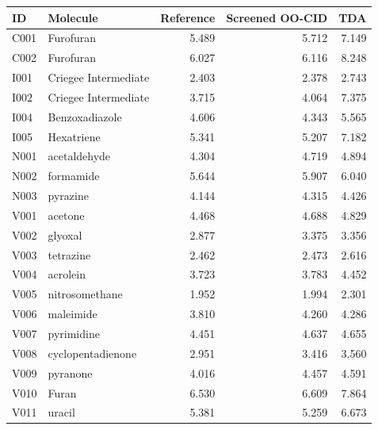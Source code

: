\begin{tabular}{llrrr}\toprule
ID & Molecule & Reference & Screened OO-CID & TDA \\ \midrule
C001 & Furofuran & 5.489 & 5.712 & 7.149 \\
C002 & Furofuran & 6.027 & 6.116 & 8.248 \\
I001 & Criegee Intermediate & 2.403 & 2.378 & 2.743 \\
I002 & Criegee Intermediate & 3.715 & 4.064 & 7.375 \\
I004 & Benzoxadiazole & 4.606 & 4.343 & 5.565 \\
I005 & Hexatriene & 5.341 & 5.207 & 7.182 \\
N001 & acetaldehyde & 4.304 & 4.719 & 4.894 \\
N002 & formamide & 5.644 & 5.907 & 6.040 \\
N003 & pyrazine & 4.144 & 4.315 & 4.426 \\
V001 & acetone & 4.468 & 4.688 & 4.829 \\
V002 & glyoxal & 2.877 & 3.375 & 3.356 \\
V003 & tetrazine & 2.462 & 2.473 & 2.616 \\
V004 & acrolein & 3.723 & 3.783 & 4.452 \\
V005 & nitrosomethane & 1.952 & 1.994 & 2.301 \\
V006 & maleimide & 3.810 & 4.260 & 4.286 \\
V007 & pyrimidine & 4.451 & 4.637 & 4.655 \\
V008 & cyclopentadienone & 2.951 & 3.416 & 3.560 \\
V009 & pyranone & 4.016 & 4.457 & 4.591 \\
V010 & Furan & 6.530 & 6.609 & 7.864 \\
V011 & uracil & 5.381 & 5.259 & 6.673 \\
\bottomrule\end{tabular}
